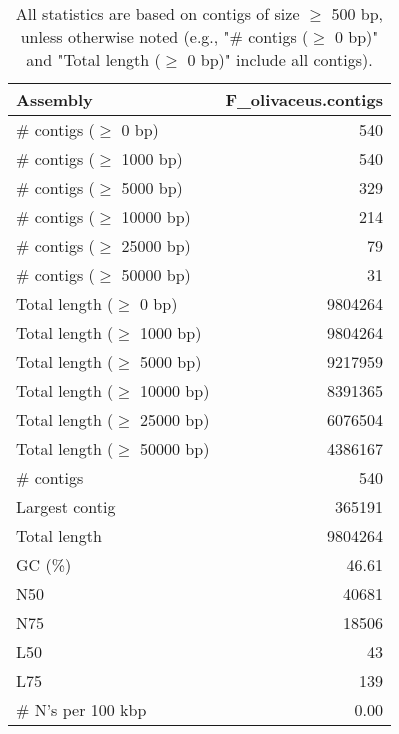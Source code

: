 \documentclass[12pt,a4paper]{article}
\begin{document}
\begin{table}[ht]
\begin{center}
\caption{All statistics are based on contigs of size $\geq$ 500 bp, unless otherwise noted (e.g., "\# contigs ($\geq$ 0 bp)" and "Total length ($\geq$ 0 bp)" include all contigs).}
\begin{tabular}{|l*{1}{|r}|}
\hline
Assembly & F\_olivaceus.contigs \\ \hline
\# contigs ($\geq$ 0 bp) & 540 \\ \hline
\# contigs ($\geq$ 1000 bp) & 540 \\ \hline
\# contigs ($\geq$ 5000 bp) & 329 \\ \hline
\# contigs ($\geq$ 10000 bp) & 214 \\ \hline
\# contigs ($\geq$ 25000 bp) & 79 \\ \hline
\# contigs ($\geq$ 50000 bp) & 31 \\ \hline
Total length ($\geq$ 0 bp) & 9804264 \\ \hline
Total length ($\geq$ 1000 bp) & 9804264 \\ \hline
Total length ($\geq$ 5000 bp) & 9217959 \\ \hline
Total length ($\geq$ 10000 bp) & 8391365 \\ \hline
Total length ($\geq$ 25000 bp) & 6076504 \\ \hline
Total length ($\geq$ 50000 bp) & 4386167 \\ \hline
\# contigs & 540 \\ \hline
Largest contig & 365191 \\ \hline
Total length & 9804264 \\ \hline
GC (\%) & 46.61 \\ \hline
N50 & 40681 \\ \hline
N75 & 18506 \\ \hline
L50 & 43 \\ \hline
L75 & 139 \\ \hline
\# N's per 100 kbp & 0.00 \\ \hline
\end{tabular}
\end{center}
\end{table}
\end{document}
